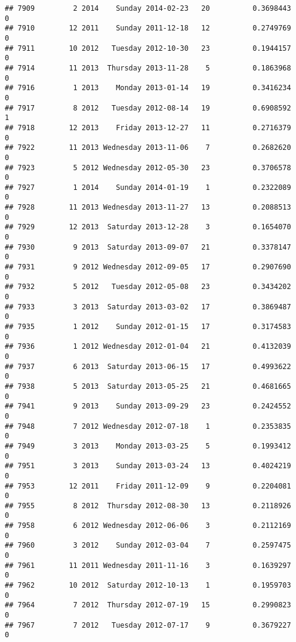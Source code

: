 \documentclass[
]{article}
\begin{document}
\begin{verbatim}
## 7909         2 2014    Sunday 2014-02-23   20          0.3698443             0
## 7910        12 2011    Sunday 2011-12-18   12          0.2749769             0
## 7911        10 2012   Tuesday 2012-10-30   23          0.1944157             0
## 7914        11 2013  Thursday 2013-11-28    5          0.1863968             0
## 7916         1 2013    Monday 2013-01-14   19          0.3416234             0
## 7917         8 2012   Tuesday 2012-08-14   19          0.6908592             1
## 7918        12 2013    Friday 2013-12-27   11          0.2716379             0
## 7922        11 2013 Wednesday 2013-11-06    7          0.2682620             0
## 7923         5 2012 Wednesday 2012-05-30   23          0.3706578             0
## 7927         1 2014    Sunday 2014-01-19    1          0.2322089             0
## 7928        11 2013 Wednesday 2013-11-27   13          0.2088513             0
## 7929        12 2013  Saturday 2013-12-28    3          0.1654070             0
## 7930         9 2013  Saturday 2013-09-07   21          0.3378147             0
## 7931         9 2012 Wednesday 2012-09-05   17          0.2907690             0
## 7932         5 2012   Tuesday 2012-05-08   23          0.3434202             0
## 7933         3 2013  Saturday 2013-03-02   17          0.3869487             0
## 7935         1 2012    Sunday 2012-01-15   17          0.3174583             0
## 7936         1 2012 Wednesday 2012-01-04   21          0.4132039             0
## 7937         6 2013  Saturday 2013-06-15   17          0.4993622             0
## 7938         5 2013  Saturday 2013-05-25   21          0.4681665             0
## 7941         9 2013    Sunday 2013-09-29   23          0.2424552             0
## 7948         7 2012 Wednesday 2012-07-18    1          0.2353835             0
## 7949         3 2013    Monday 2013-03-25    5          0.1993412             0
## 7951         3 2013    Sunday 2013-03-24   13          0.4024219             0
## 7953        12 2011    Friday 2011-12-09    9          0.2204081             0
## 7955         8 2012  Thursday 2012-08-30   13          0.2118926             0
## 7958         6 2012 Wednesday 2012-06-06    3          0.2112169             0
## 7960         3 2012    Sunday 2012-03-04    7          0.2597475             0
## 7961        11 2011 Wednesday 2011-11-16    3          0.1639297             0
## 7962        10 2012  Saturday 2012-10-13    1          0.1959703             0
## 7964         7 2012  Thursday 2012-07-19   15          0.2990823             0
## 7967         7 2012   Tuesday 2012-07-17    9          0.3679227             0

\end{verbatim}
\end{document}
